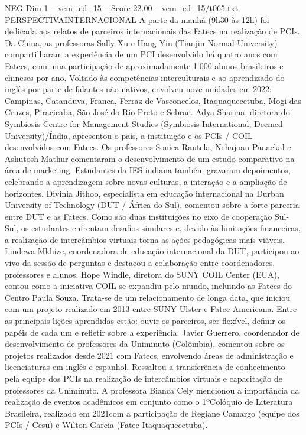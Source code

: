 \begin{textsample}{NEG Dim 1 – vem\_ed\_15 – Score 22.00 – vem\_ed\_15/t065.txt}  \label{ex:f1_neg_093}
PERSPECTIVAINTERNACIONAL A parte da manhã (9h30 às 12h) foi dedicada aos relatos de parceiros internacionais das Fatecs na realização de PCIs.
Da China, as professoras Sally Xu e Hang Yin (Tianjin Normal University) compartilharam a experiência de um PCI desenvolvido há quatro anos com Fatecs, com uma participação de aproximadamente 1.000 alunos brasileiros e chineses por ano.
Voltado às competências interculturais e ao aprendizado do inglês por parte de falantes não-nativos, envolveu nove unidades em 2022: Campinas, Catanduva, Franca, Ferraz de Vasconcelos, Itaquaquecetuba, Mogi das Cruzes, Piracicaba, São José do Rio Preto e Sebrae.
Adya Sharma, diretora do Symbiosis Centre for Management Studies (Symbiosis International, Deemed University)/Índia, apresentou o país, a instituição e os PCIs / COIL desenvolvidos com Fatecs.
Os professores Sonica Rautela, Nehajoan Panackal e Ashutosh Mathur comentaram o desenvolvimento de um estudo comparativo na área de marketing.
Estudantes da IES indiana também gravaram depoimentos, celebrando a aprendizagem sobre novas culturas, a interação e a ampliação de horizontes.
Divinia Jithoo, especialista em educação internacional na Durban University of Technology (DUT / África do Sul), comentou sobre a forte parceria entre DUT e as Fatecs.
Como são duas instituições no eixo de cooperação Sul-Sul, os estudantes enfrentam desafios similares e, devido às limitações financeiras, a realização de intercâmbios virtuais torna as ações pedagógicas mais viáveis.
Lindewa Mkhize, coordenadora de educação internacional da DUT, participou ao vivo da sessão de perguntas e destacou a colaboração entre coordenadores, professores e alunos.
Hope Windle, diretora do SUNY COIL Center (EUA), contou como a iniciativa COIL se expandiu pelo mundo, incluindo as Fatecs do Centro Paula Souza.
Trata-se de um relacionamento de longa data, que iniciou com um projeto realizado em 2013 entre SUNY Ulster e Fatec Americana.
Entre as principais lições aprendidas estão: ouvir os parceiros, ser flexível, definir os papéis de cada um e refletir sobre a experiência.
Javier Guerrero, coordenador de desenvolvimento de professores da Uniminuto (Colômbia), comentou sobre os projetos realizados desde 2021 com Fatecs, envolvendo áreas de administração e licenciaturas em inglês e espanhol.
Ressaltou a transferência de conhecimento pela equipe dos PCIs na realização de intercâmbios virtuais e capacitação de professores da Uniminuto.
A professora Bianca Cely mencionou a importância da realização de eventos acadêmicos em conjunto como o 1ºColóquio de Literatura Brasileira, realizado em 2021com a participação de Regiane Camargo (equipe dos PCIs / Cesu) e Wilton Garcia (Fatec Itaquaquecetuba).

\end{textsample}
